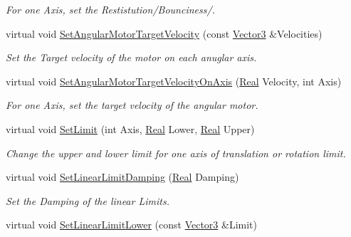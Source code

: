 \begin{DoxyCompactItemize}
\begin{DoxyCompactList}\small\item\em For one Axis, set the Restistution/Bounciness/. \item\end{DoxyCompactList}\item 
virtual void \hyperlink{classMezzanine_1_1Generic6DofConstraint_a83e6642525b862d2b0f213f4196cfee6}{SetAngularMotorTargetVelocity} (const \hyperlink{classMezzanine_1_1Vector3}{Vector3} \&Velocities)
\begin{DoxyCompactList}\small\item\em Set the Target velocity of the motor on each anuglar axis. \item\end{DoxyCompactList}\item 
virtual void \hyperlink{classMezzanine_1_1Generic6DofConstraint_a40d21ce4c86538080ab574e5ddee5db8}{SetAngularMotorTargetVelocityOnAxis} (\hyperlink{namespaceMezzanine_a726731b1a7df72bf3583e4a97282c6f6}{Real} Velocity, int Axis)
\begin{DoxyCompactList}\small\item\em For one Axis, set the target velocity of the angular motor. \item\end{DoxyCompactList}\item 
virtual void \hyperlink{classMezzanine_1_1Generic6DofConstraint_af8d66ec56818e651c0e429b944f7b823}{SetLimit} (int Axis, \hyperlink{namespaceMezzanine_a726731b1a7df72bf3583e4a97282c6f6}{Real} Lower, \hyperlink{namespaceMezzanine_a726731b1a7df72bf3583e4a97282c6f6}{Real} Upper)
\begin{DoxyCompactList}\small\item\em Change the upper and lower limit for one axis of translation or rotation limit. \item\end{DoxyCompactList}\item 
virtual void \hyperlink{classMezzanine_1_1Generic6DofConstraint_a8bd3f660e157fb666872e09d32e7ca1c}{SetLinearLimitDamping} (\hyperlink{namespaceMezzanine_a726731b1a7df72bf3583e4a97282c6f6}{Real} Damping)
\begin{DoxyCompactList}\small\item\em Set the Damping of the linear Limits. \item\end{DoxyCompactList}\item 
virtual void \hyperlink{classMezzanine_1_1Generic6DofConstraint_a5d90b3129b41ab7dbcf545cdc7496a7d}{SetLinearLimitLower} (const \hyperlink{classMezzanine_1_1Vector3}{Vector3} \&Limit)

\end{DoxyCompactItemize}
